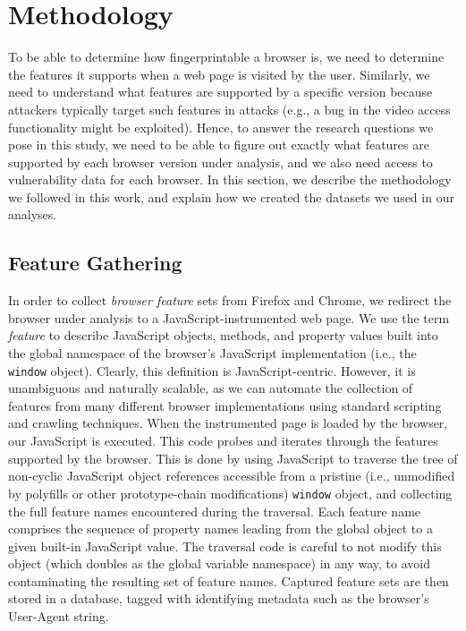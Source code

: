 \section{Methodology}
\label{sec:methodology}

To be able to determine how fingerprintable a browser is, we need to
determine the features it supports when a web page is visited by the
user. Similarly, we need to understand what features are supported by
a specific version because attackers typically target such features in
attacks (e.g., a bug in the video access functionality might be
exploited). Hence, to answer the research questions we pose in this
study, we need to be able to figure out exactly what features are
supported by each browser version under analysis, and we also need
access to vulnerability data for each browser. In this section, we
describe the methodology we followed in this work, and explain how we
created the datasets we used in our analyses.

\subsection{Feature Gathering}
\label{sec:feature-gathering}

In order to collect \textit{browser feature} sets from Firefox and
Chrome, we redirect the browser under analysis to a
JavaScript-instrumented web page. We use the term \textit{feature} to
describe JavaScript objects, methods, and property values built into the
global namespace of the browser's JavaScript implementation (i.e., the
\texttt{window} object).  Clearly, this definition is
JavaScript-centric. However, it is unambiguous and naturally scalable,
as we can automate the collection of features from many different
browser implementations using standard scripting and crawling
techniques. When the instrumented page is loaded by the browser, our
JavaScript is executed.  This code probes and iterates through the
features supported by the browser. This is done by using JavaScript to
traverse the tree of non-cyclic JavaScript object references accessible
from a pristine (i.e., unmodified by polyfills or other prototype-chain
modifications) \texttt{window} object, and collecting the full feature
names encountered during the traversal. Each feature name comprises the
sequence of property names leading from the global object to a given
built-in JavaScript value. The traversal code is careful to not modify
this object (which doubles as the global variable namespace) in any way,
to avoid contaminating the resulting set of feature names. Captured
feature sets are then stored in a database, tagged with identifying
metadata such as the browser's User-Agent string.

